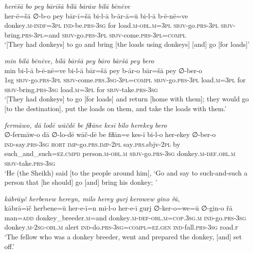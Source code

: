 \ea \label{HB.9}
\textit{herēšā bo pey bārīšā bilā bārāw bilā bēnēve} \\ 
\gll her-ē=šā ∅-b-o pey bār-ī=šā bi-l-ā b-ār-ā=ū bi-l-ā b-ē-nē=ve \\ 
 donkey\textsc{.m}\textsc{-indf}\textsc{=3pl} \textsc{ind-}be\textsc{.prs}\textsc{-3sg} for load\textsc{.m}\textsc{-obl}\textsc{.m}\textsc{=3pl} \textsc{sbjv-}go\textsc{.prs}\textsc{-3pl} \textsc{sbjv-}bring\textsc{.prs}\textsc{-3pl}=and \textsc{sbjv-}go\textsc{.prs}\textsc{-3pl} \textsc{sbjv-}come\textsc{.prs}\textsc{-3pl}\textsc{=compl} \\ 
\glt `[They had donkeys] to go and bring [the loads using donkeys] [and] go [for loads]'
\z 
 
\ea \label{HB.10}
\textit{min bilā bēnēve, bilā bāršā pey bāro bāršā pey bero} \\ 
\gll min bi-l-ā b-ē-nē=ve bi-l-ā bār=šā pey b-ār-o bār=šā pey ∅-ber-o \\ 
 1sg \textsc{sbjv-}go\textsc{.prs}\textsc{-3pl} \textsc{sbjv-}come\textsc{.prs}\textsc{.3sg}\textsc{-3pl}\textsc{=compl} \textsc{sbjv-}go\textsc{.prs}\textsc{-3pl} load\textsc{.m}\textsc{=3pl} for \textsc{sbjv-}bring\textsc{.prs}\textsc{-3sg} load\textsc{.m}\textsc{=3pl} for \textsc{sbjv-}take\textsc{.prs}\textsc{-3sg} \\ 
\glt `[They had donkeys] to go [for loads] and return [home with them]; they would go [to the destination], put the loads on them, and take the loads with them.'
\z 
 
\ea \label{HB.11}
\textit{fermāwo, dā lodē wāčdē be fiɫāne kesī bilo herekey bero} \\ 
\gll ∅-fermāw-o dā ∅-lo-dē wāč-dē be fiɫān=e kes-ī bi-l-o her-ekey ∅-ber-o \\ 
 \textsc{ind-}say\textsc{.prs}\textsc{-3sg} \textsc{hort} \textsc{imp-}go\textsc{.prs}\textsc{.imp}\textsc{-2pl} say\textsc{.prs}.sbjv\textsc{-2pl} by such\_and\_such\textsc{=ez}\textsc{.cmpd} person\textsc{.m}\textsc{-obl}\textsc{.m} \textsc{sbjv-}go\textsc{.prs}\textsc{-3sg} donkey\textsc{.m}\textsc{-def}\textsc{.obl}\textsc{.m} \textsc{sbjv-}take\textsc{.prs}\textsc{-3sg} \\ 
\glt `He (the Sheikh) said [to the people around him], ‘Go and say to such-and-such a person that [he should] go [and] bring his donkey; '
\z 
 
\ea \label{HB.15}
\textit{kābrāyč herbenew hereyn, milo herey gurj kerowew gino řā,} \\ 
\gll kābrā=īč herbene=ū her-e-ī=n mi-l-o her-e-ī gurj ∅-ker-o=we=ū ∅-gin-o řā \\ 
 man\textsc{=add} donkey\_breeder\textsc{.m}=and donkey\textsc{.m}\textsc{-def}\textsc{-obl}\textsc{.m}\textsc{=cop}\textsc{.3sg}\textsc{.m} \textsc{ind-}go\textsc{.prs}\textsc{-3sg} donkey\textsc{.m}-\textsc{2sg}\textsc{-obl}\textsc{.m} alert \textsc{ind-}do\textsc{.prs}\textsc{-3sg}\textsc{=\textsc{compl}}\textsc{=ez}\textsc{.gen} \textsc{ind-}fall\textsc{.prs}\textsc{-3sg} road\textsc{\textsc{.f}} \\ 
\glt `The fellow who was a donkey breeder, went and prepared the donkey, [and] set off.'
\z 
 
